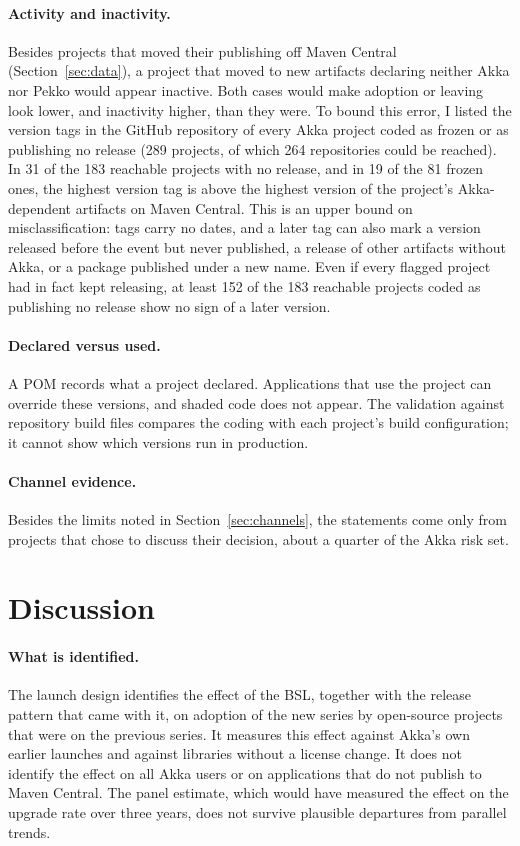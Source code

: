 \documentclass[11pt]{article}
\begin{document}
\paragraph{Activity and inactivity.} Besides projects that moved their publishing off Maven Central (Section~\ref{sec:data}), a project that moved to new artifacts declaring neither Akka nor Pekko would appear inactive. Both cases would make adoption or leaving look lower, and inactivity higher, than they were. To bound this error, I listed the version tags in the GitHub repository of every Akka project coded as frozen or as publishing no release (289 projects, of which 264 repositories could be reached). In 31 of the 183 reachable projects with no release, and in 19 of the 81 frozen ones, the highest version tag is above the highest version of the project's Akka-dependent artifacts on Maven Central. This is an upper bound on misclassification: tags carry no dates, and a later tag can also mark a version released before the event but never published, a release of other artifacts without Akka, or a package published under a new name. Even if every flagged project had in fact kept releasing, at least 152 of the 183 reachable projects coded as publishing no release show no sign of a later version.

\paragraph{Declared versus used.} A POM records what a project declared. Applications that use the project can override these versions, and shaded code does not appear. The validation against repository build files compares the coding with each project's build configuration; it cannot show which versions run in production.

\paragraph{Channel evidence.} Besides the limits noted in Section~\ref{sec:channels}, the statements come only from projects that chose to discuss their decision, about a quarter of the Akka risk set.

\section{Discussion}\label{sec:discussion}

\paragraph{What is identified.} The launch design identifies the effect of the BSL, together with the release pattern that came with it, on adoption of the new series by open-source projects that were on the previous series. It measures this effect against Akka's own earlier launches and against libraries without a license change. It does not identify the effect on all Akka users or on applications that do not publish to Maven Central. The panel estimate, which would have measured the effect on the upgrade rate over three years, does not survive plausible departures from parallel trends.
\end{document}
